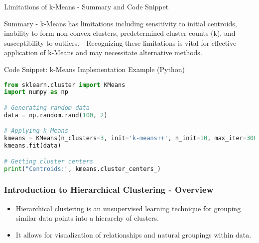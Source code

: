 \documentclass[aspectratio=169]{beamer}
\begin{document}
\begin{frame}[fragile]{Limitations of k-Means - Summary and Code Snippet}
    \begin{block}{Summary}
        - k-Means has limitations including sensitivity to initial centroids, inability to form non-convex clusters, predetermined cluster counts (k), and susceptibility to outliers.
        - Recognizing these limitations is vital for effective application of k-Means and may necessitate alternative methods.
    \end{block}
    
    \begin{block}{Code Snippet: k-Means Implementation Example (Python)}
        \begin{lstlisting}[language=Python]
from sklearn.cluster import KMeans
import numpy as np

# Generating random data
data = np.random.rand(100, 2)

# Applying k-Means
kmeans = KMeans(n_clusters=3, init='k-means++', n_init=10, max_iter=300)
kmeans.fit(data)

# Getting cluster centers
print("Centroids:", kmeans.cluster_centers_)
        \end{lstlisting}
    \end{block}
\end{frame}

\begin{frame}[fragile]
    \frametitle{Introduction to Hierarchical Clustering - Overview}
    \begin{itemize}
        \item Hierarchical clustering is an unsupervised learning technique for grouping similar data points into a hierarchy of clusters.
        \item It allows for visualization of relationships and natural groupings within data.
    \end{itemize}
\end{frame}
\end{document}
